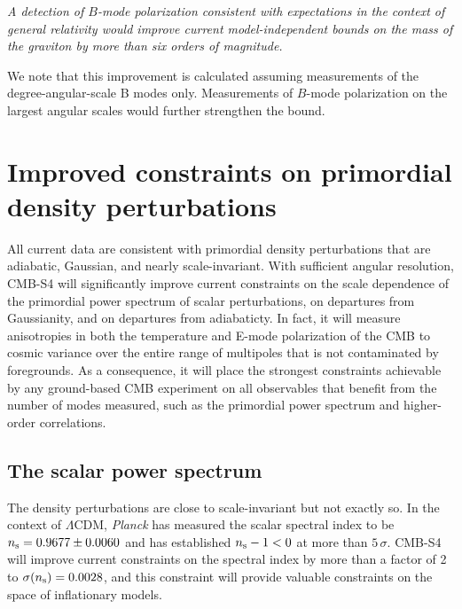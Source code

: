 {\it A detection of $B$-mode polarization consistent with expectations in the context of general relativity would improve current model-independent bounds on the mass of the graviton by more than six orders of magnitude.} 

We note that this improvement is calculated assuming measurements of the degree-angular-scale B modes only. Measurements of $B$-mode polarization on the largest angular scales would further strengthen the bound. 



\section{Improved constraints on primordial density perturbations}
\label{sec:scalar}
All current data are consistent with primordial density perturbations that are adiabatic, Gaussian, and nearly scale-invariant. With sufficient angular resolution, CMB-S4 will significantly improve current constraints on the scale dependence of the primordial power spectrum of scalar perturbations, on departures from Gaussianity, and on departures from adiabaticty. In fact, it will measure anisotropies in both the temperature and E-mode polarization of the CMB to cosmic variance over the entire range of multipoles that is not contaminated by foregrounds. As a consequence, it will place the strongest constraints achievable by any ground-based CMB experiment on all observables that benefit from the number of modes measured, such as the primordial power spectrum and higher-order correlations.

\subsection{The scalar power spectrum}
The density perturbations are close to scale-invariant but not exactly so. In the context of $\Lambda$CDM, {\it Planck\/} has measured the scalar spectral index to be $n_{\rm s}=0.9677\pm0.0060$ and has established $n_{\rm s}-1<0$ at more than $5\,\sigma$. CMB-S4 will improve current constraints on the spectral index by more than a factor of 2 to $\sigma(n_{\rm s})=0.0028$, and this constraint will provide valuable constraints on the space of inflationary models. 

